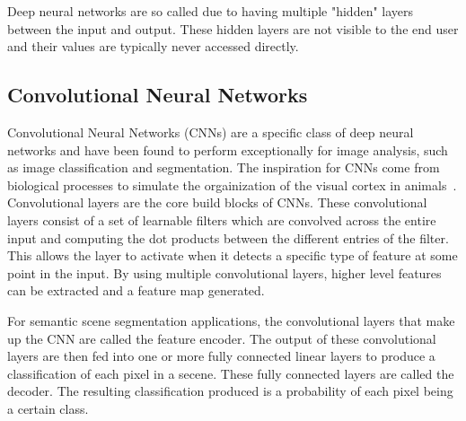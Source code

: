 Deep neural networks are so called due to having multiple "hidden" layers between the input and output.
These hidden layers are not visible to the end user and their values are typically never accessed directly.

\subsection{Convolutional Neural Networks}\label{section:background-cnn}
Convolutional Neural Networks (CNNs) are a specific class of deep neural networks and have been found to perform exceptionally for image analysis, such as image classification and segmentation.
The inspiration for CNNs come from biological processes to simulate the orgainization of the visual cortex in animals~\cite{cnnbiology}.
Convolutional layers are the core build blocks of CNNs.
These convolutional layers consist of a set of learnable filters which are convolved across the entire input and computing the dot products between the different entries of the filter.
This allows the layer to activate when it detects a specific type of feature at some point in the input.
By using multiple convolutional layers, higher level features can be extracted and a feature map generated.

For semantic scene segmentation applications, the convolutional layers that make up the CNN are called the feature encoder.
The output of these convolutional layers are then fed into one or more fully connected linear layers to produce a classification of each pixel in a secene.
These fully connected layers are called the decoder.
The resulting classification produced is a probability of each pixel being a certain class.
